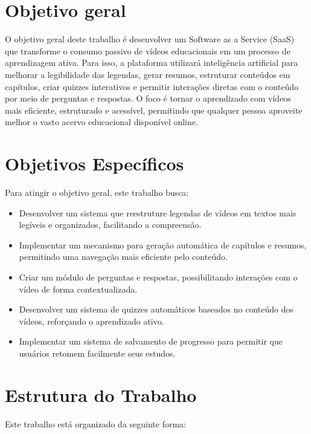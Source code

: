 \documentclass[tcc,capa]{texufpel}
\begin{document}
\section{Objetivo geral}
O objetivo geral deste trabalho é desenvolver um Software as a Service (SaaS) que transforme o consumo passivo de vídeos educacionais em um processo de aprendizagem ativa. Para isso, a plataforma utilizará inteligência artificial para melhorar a legibilidade das legendas, gerar resumos, estruturar conteúdos em capítulos, criar quizzes interativos e permitir interações diretas com o conteúdo por meio de perguntas e respostas. O foco é tornar o aprendizado com vídeos mais eficiente, estruturado e acessível, permitindo que qualquer pessoa aproveite melhor o vasto acervo educacional disponível online.
\section{Objetivos Específicos}

Para atingir o objetivo geral, este trabalho busca:

\begin{itemize}
    \item Desenvolver um sistema que reestruture legendas de vídeos em textos mais legíveis e organizados, facilitando a compreensão.
    \item Implementar um mecanismo para geração automática de capítulos e resumos, permitindo uma navegação mais eficiente pelo conteúdo.
    \item Criar um módulo de perguntas e respostas, possibilitando interações com o vídeo de forma contextualizada.
    \item Desenvolver um sistema de quizzes automáticos baseados no conteúdo dos vídeos, reforçando o aprendizado ativo.
    \item Implementar um sistema de salvamento de progresso para permitir que usuários retomem facilmente seus estudos.
\end{itemize}

\section{Estrutura do Trabalho}
Este trabalho está organizado da seguinte forma:
\end{document}
